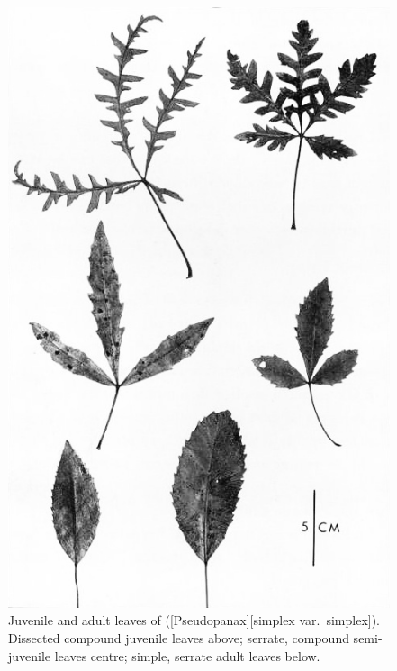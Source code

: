 \begin{figure}[!b]
	\begin{minipage}[t]{\textwidth}
		\begin{minipage}[t]{(\textwidth-\fgap) * \real{0.526}}
			\centering
			\includegraphics[width=\textwidth]{graphics/figure18pseudopanax.jpg}
			\caption[Juvenile and adult leaves of \emph{Pseudopanax simplex var.\ simplex}]{Juvenile and adult leaves of  ([Pseudopanax][simplex var.\ simplex]).
			Dissected compound juvenile leaves above; serrate, compound semi-juvenile leaves centre; simple, serrate adult leaves below.
}
\end{minipage}
\end{minipage}
\end{figure}
